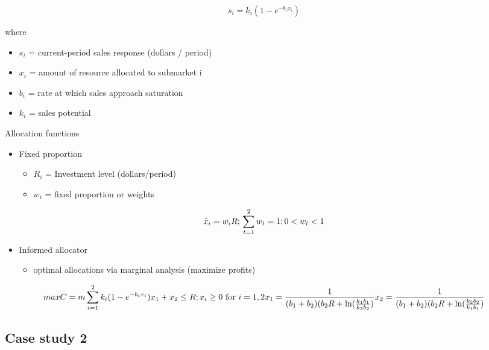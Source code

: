 \documentclass[
]{book}
\providecommand{\tightlist}{%
  \setlength{\itemsep}{0pt}\setlength{\parskip}{0pt}}
\begin{document}
\[
s_i = k_i (1- e^{-b_i x_i})
\]

where

\begin{itemize}
\tightlist
\item
  \(s_i\) = current-period sales response (dollars / period)
\item
  \(x_i\) = amount of resource allocated to submarket i
\item
  \(b_i\) = rate at which sales approach saturation
\item
  \(k_i\) = sales potential
\end{itemize}

Allocation functions

\begin{itemize}
\item
  Fixed proportion

  \begin{itemize}
  \item
    \(R_i\) = Investment level (dollars/period)
  \item
    \(w_i\) = fixed proportion or weights
  \end{itemize}
\end{itemize}

\[
\hat{x}_i = w_i R; \\
\sum_{t=1}^2 w_t = 1; 0 < w_t < 1
\]

\begin{itemize}
\item
  Informed allocator

  \begin{itemize}
  \tightlist
  \item
    optimal allocations via marginal analysis (maximize profits)
  \end{itemize}
\end{itemize}

\[
max C = m \sum_{i = 1}^2 k_i (1- e^{-b_i x_i}) \\
x_1 + x_2 \le R; x_i  \ge 0 \text{ for } i = 1,2 \\
x_1 = \frac{1}{(b_1 + b_2)(b_2 R + \ln(\frac{k_1b_1}{k_2b_2})} \\
x_2 = \frac{1}{(b_1 + b_2)(b_2 R + \ln(\frac{k_2b_2}{k_1b_1})}
\]

\hypertarget{case-study-2}{%
\subsection{Case study 2}\label{case-study-2}}
\end{document}
